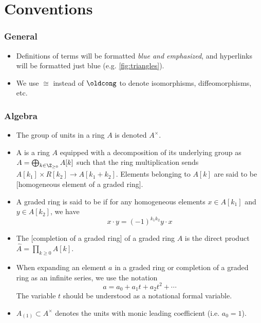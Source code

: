 \chapter*{Conventions}

\subsection*{General}

\begin{itemize}
  \item Definitions of terms will be formatted {\color{blue}\emph{blue and emphasized}}, and hyperlinks will be formatted just blue (e.g. \cref{fig:triangles}).
  \item We use $\cong$ instead of $\oldcong$ to denote isomorphisms, diffeomorphisms, etc.
\end{itemize}

\subsection*{Algebra}

\begin{itemize}
  \item The group of units in a ring $A$ is denoted $A^\times$.
  \item A  is a ring $A$ equipped with a decomposition of its underlying group as $A=\bigoplus_{k\in \Z_{\geq 0}} A[k]$ such that the ring multiplication sends $A[k_1]\times R[k_2] \to A[k_1+k_2]$. Elements belonging to $A[k]$ are said to be [homogeneous element of a graded ring]. 
  \item A graded ring is said to be  if for any homogeneous elements $x\in A[k_1]$ and $y\in A[k_2]$, we have
    \[
      x\cdot y = (-1)^{k_1k_2} y\cdot x
    \]
  \item The [completion of a graded ring] of a graded ring $A$ is the direct product $\widehat{A} = \prod_{k\geq 0} A[k]$.
  \item When expanding an element $a$ in a graded ring or completion of a graded ring as an infinite series, we use the notation
  \[
      a = a_0 + a_1t+a_2t^2+\cdots
  \]
  The variable $t$ should be understood as a notational formal variable.
  \item $A_{(1)}\subset A^\times$ denotes the units with monic leading coefficient (i.e. $a_0=1$).
\end{itemize}

